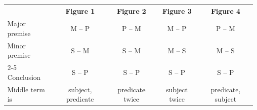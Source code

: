 \begin{center}
\renewcommand{\arraystretch}{1.35}
\begin{tabular}{l c c c c}
\toprule
 & \textbf{Figure 1} & \textbf{Figure 2} & \textbf{Figure 3} & \textbf{Figure 4} \\
\midrule
Major premise & M -- P & P -- M & M -- P & P -- M \\
Minor premise & S -- M & S -- M & M -- S & M -- S \\
\cmidrule(l){2-5}
Conclusion & S -- P & S -- P & S -- P & S -- P \\
\midrule
Middle term is & subject, predicate & predicate twice & subject twice & predicate, subject \\
\bottomrule
\end{tabular}
\end{center}
